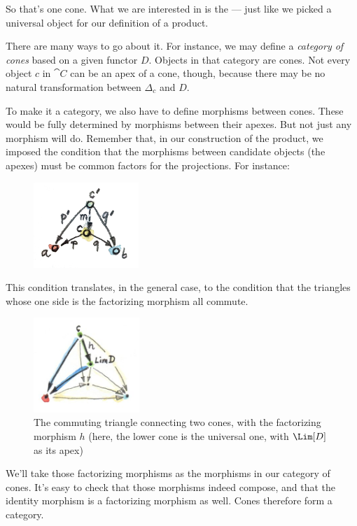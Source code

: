 \noindent
So that's one cone. What we are interested in is the  --- just like we picked a universal object for our definition of a
product.

There are many ways to go about it. For instance, we may define a
\emph{category of cones} based on a given functor $D$. Objects in that
category are cones. Not every object $c$ in $\cat{C}$ can be an
apex of a cone, though, because there may be no natural transformation
between $\Delta_c$ and $D$.

To make it a category, we also have to define morphisms between cones.
These would be fully determined by morphisms between their apexes. But
not just any morphism will do. Remember that, in our construction of the
product, we imposed the condition that the morphisms between candidate
objects (the apexes) must be common factors for the projections. For
instance:


\begin{figure}[H]
\centering
\includegraphics[width=1.56250in]{images/productranking.jpg}
\end{figure}

This condition translates, in the general case, to the condition that
the triangles whose one side is the factorizing morphism all commute.

\begin{figure}[H]
\centering
\includegraphics[width=40mm]{images/conecommutativity.jpg}
\caption{The commuting triangle connecting two cones, with the factorizing
morphism $h$ (here, the lower cone is the universal one, with
$\Lim[D]$ as its apex)}
\end{figure}

\noindent
We'll take those factorizing morphisms as the morphisms in our category
of cones. It's easy to check that those morphisms indeed compose, and
that the identity morphism is a factorizing morphism as well. Cones
therefore form a category.

